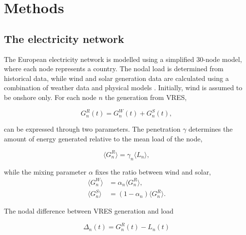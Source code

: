 \documentclass[a4paper, 5p, sort&compress]{elsarticle}%
\newcommand{\mean}[1]{\langle #1 \rangle}
\newcommand{\paren}[1]{\left(#1\right)}
\begin{document}
\section{Methods}
\label{sec:two}
\subsection{The electricity network}

The European electricity network is modelled using a simplified
30-node model, where each node represents a country. The nodal load is
determined from historical data, while wind and solar generation data
are calculated using a combination of weather data and physical models
\cite{REA}. Initially, wind is assumed to be onshore only. For each
node $n$ the generation from VRES,

\begin{equation}
  G^{R}_{n}(t) = G_{n}^{W}(t) + G_{n}^{S}(t),
\end{equation} 

can be expressed through two parameters. The penetration $\gamma$
determines the amount of energy generated relative to the mean load of
the node,

\begin{equation}
  \mean{G^{R}_{n}} = \gamma_{n} \mean{L_{n}} ,
\end{equation} 

while the mixing parameter $\alpha$ fixes the ratio between wind and solar,
\begin{align}
  \mean{G^{W}_{n}} &=  \alpha_{n} \mean{G_{n}^{R}}  , \\
  \mean{G^{S}_{n}} &=  \paren{1- \alpha_{n}} \mean{G_{n}^{R}}  .
\end{align} 

The nodal difference between VRES generation and load

\begin{equation}
  \Delta_{n}(t) = G^{R}_{n}(t) - L_{n}(t)
\end{equation}
\end{document}
